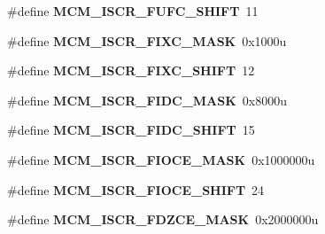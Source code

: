 \begin{DoxyCompactItemize}
\item 
\#define {\bfseries M\+C\+M\+\_\+\+I\+S\+C\+R\+\_\+\+F\+U\+F\+C\+\_\+\+S\+H\+I\+FT}~11\hypertarget{group__MCM__Register__Masks_ga2fed77fb78e7bc8ae312713ef58d263a}{}\label{group__MCM__Register__Masks_ga2fed77fb78e7bc8ae312713ef58d263a}

\item 
\#define {\bfseries M\+C\+M\+\_\+\+I\+S\+C\+R\+\_\+\+F\+I\+X\+C\+\_\+\+M\+A\+SK}~0x1000u\hypertarget{group__MCM__Register__Masks_gabe836f6795a2a2a95ff9b6a64d9a24fe}{}\label{group__MCM__Register__Masks_gabe836f6795a2a2a95ff9b6a64d9a24fe}

\item 
\#define {\bfseries M\+C\+M\+\_\+\+I\+S\+C\+R\+\_\+\+F\+I\+X\+C\+\_\+\+S\+H\+I\+FT}~12\hypertarget{group__MCM__Register__Masks_ga5c1b020ff2a6d0d96bf62556bb035fcd}{}\label{group__MCM__Register__Masks_ga5c1b020ff2a6d0d96bf62556bb035fcd}

\item 
\#define {\bfseries M\+C\+M\+\_\+\+I\+S\+C\+R\+\_\+\+F\+I\+D\+C\+\_\+\+M\+A\+SK}~0x8000u\hypertarget{group__MCM__Register__Masks_gaeca36bf639a606a24f7ee6a4fc983528}{}\label{group__MCM__Register__Masks_gaeca36bf639a606a24f7ee6a4fc983528}

\item 
\#define {\bfseries M\+C\+M\+\_\+\+I\+S\+C\+R\+\_\+\+F\+I\+D\+C\+\_\+\+S\+H\+I\+FT}~15\hypertarget{group__MCM__Register__Masks_gaaf16fcce0e380e7f200d910008794028}{}\label{group__MCM__Register__Masks_gaaf16fcce0e380e7f200d910008794028}

\item 
\#define {\bfseries M\+C\+M\+\_\+\+I\+S\+C\+R\+\_\+\+F\+I\+O\+C\+E\+\_\+\+M\+A\+SK}~0x1000000u\hypertarget{group__MCM__Register__Masks_gaf48976f7ac1761a6145eea9a6add5ff5}{}\label{group__MCM__Register__Masks_gaf48976f7ac1761a6145eea9a6add5ff5}

\item 
\#define {\bfseries M\+C\+M\+\_\+\+I\+S\+C\+R\+\_\+\+F\+I\+O\+C\+E\+\_\+\+S\+H\+I\+FT}~24\hypertarget{group__MCM__Register__Masks_ga97f10ab969b7c83eb9cde216807b215b}{}\label{group__MCM__Register__Masks_ga97f10ab969b7c83eb9cde216807b215b}

\item 
\#define {\bfseries M\+C\+M\+\_\+\+I\+S\+C\+R\+\_\+\+F\+D\+Z\+C\+E\+\_\+\+M\+A\+SK}~0x2000000u\hypertarget{group__MCM__Register__Masks_ga2ad0b7495aba7dacde7658c2a71db6bd}{}\label{group__MCM__Register__Masks_ga2ad0b7495aba7dacde7658c2a71db6bd}


\end{DoxyCompactItemize}
